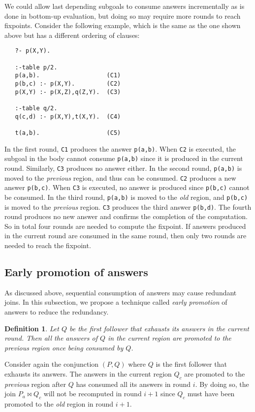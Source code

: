 \documentclass{tlp}
\newtheorem{definition}{Definition} \newtheorem{example}{Example} \newcommand{\pivot}[1]{\mathbin{\, {#1} \,}}
\begin{document}
We could allow last depending subgoals to consume answers incrementally as is done in bottom-up evaluation, but doing so may require more rounds to reach fixpoints. Consider the following example, which is the same as the one shown above but has a different ordering of clauses:
\begin{verbatim}
   ?- p(X,Y).

   :-table p/2.
   p(a,b).                   (C1)
   p(b,c) :- p(X,Y).         (C2)
   p(X,Y) :- p(X,Z),q(Z,Y).  (C3)

   :-table q/2.
   q(c,d) :- p(X,Y),t(X,Y).  (C4)

   t(a,b).                   (C5)
\end{verbatim}
In the first round, {\tt C1} produces the answer {\tt p(a,b)}. When {\tt C2} is executed, the subgoal in the body cannot consume {\tt p(a,b)} since it is produced in the current round. Similarly, {\tt C3} produces no answer either. In the second round, {\tt p(a,b)} is moved to the {\it previous} region, and thus can be consumed. {\tt C2} produces a new answer {\tt p(b,c)}. When {\tt C3} is executed, no answer is produced since {\tt p(b,c)} cannot be consumed. In the third round, {\tt p(a,b)} is moved to the {\it old} region, and {\tt p(b,c)} is moved to the {\it previous} region. {\tt C3} produces the third answer {\tt p(b,d)}. The fourth round produces no new answer and confirms the completion of the computation. So in total four rounds are needed to compute the fixpoint. If answers produced in the current round are consumed in the same round, then only two rounds are needed to reach the fixpoint.

\vspace*{0.5cm}
\subsection{Early promotion of answers}
As discussed above, sequential consumption of answers may cause redundant joins. In this subsection, we propose a technique called {\it early promotion} of answers to reduce the redundancy.

\begin{definition} {\rm Let $Q$ be the first follower that exhausts its answers in the current round.
Then all the answers of $Q$ in the {\it current} region are promoted to the {\it previous} region once being consumed by $Q$.}
\end{definition}

Consider again the conjunction $(P,Q)$ where $Q$ is the first follower that exhausts its answers. The answers in the current region $Q_c$ are promoted to the {\it previous} region after $Q$ has consumed all its answers in round $i$. By doing so, the join $P_a \Join Q_c$ will not be recomputed in round $i+1$ since $Q_c$ must have been promoted to the {\it old} region in round $i+1$.
\end{document}
